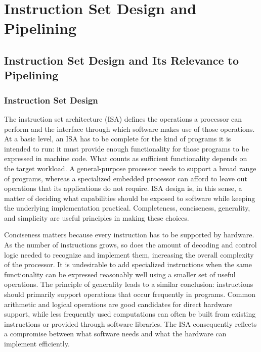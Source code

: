 \documentclass[12pt,a4paper]{report}
\begin{document}
\chapter{Instruction Set Design and Pipelining}
\label{ch:pipeline-basics}

\section{Instruction Set Design and Its Relevance to Pipelining}
\label{sec:isa-tradeoffs}

\subsection{Instruction Set Design}

The instruction set architecture (ISA) defines the operations a processor can perform and the interface through which software makes use of those operations. At a basic level, an ISA has to be complete for the kind of programs it is intended to run: it must provide enough functionality for those programs to be expressed in machine code. What counts as sufficient functionality depends on the target workload. A general-purpose processor needs to support a broad range of programs, whereas a specialized embedded processor can afford to leave out operations that its applications do not require. ISA design is, in this sense, a matter of deciding what capabilities should be exposed to software while keeping the underlying implementation practical. Completeness, conciseness, generality, and simplicity are useful principles in making these choices.

Conciseness matters because every instruction has to be supported by hardware. As the number of instructions grows, so does the amount of decoding and control logic needed to recognize and implement them, increasing the overall complexity of the processor. It is undesirable to add specialized instructions when the same functionality can be expressed reasonably well using a smaller set of useful operations. The principle of generality leads to a similar conclusion: instructions should primarily support operations that occur frequently in programs. Common arithmetic and logical operations are good candidates for direct hardware support, while less frequently used computations can often be built from existing instructions or provided through software libraries. The ISA consequently reflects a compromise between what software needs and what the hardware can implement efficiently.
\end{document}

